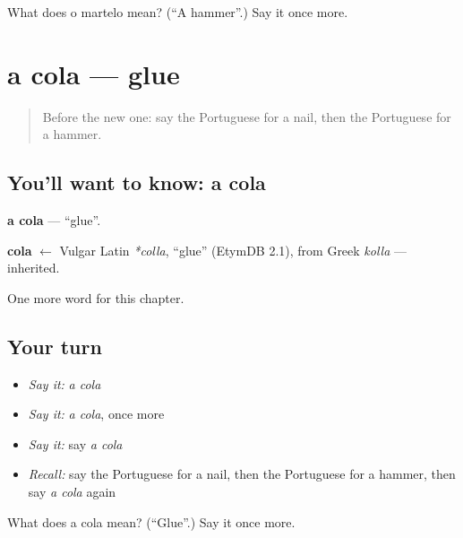 \begin{tcolorbox}[breakable,colback=teal!4,colframe=teal!35!black,title={Before you move on}]
What does o martelo mean? (\textquotedblleft{}A hammer\textquotedblright{}.) Say it once more.
\end{tcolorbox}
\section[a cola]{a cola — glue}

\label{lesson:PT-C98-cola}



\begin{quote}
Before the new one: say the Portuguese for a nail, then the Portuguese for a hammer.
\end{quote}

\subsection*{You'll want to know: a cola}
\textbf{a cola} — \textquotedblleft{}glue\textquotedblright{}.

\begin{cousinweb}
\textbf{cola} $\leftarrow$ Vulgar Latin \emph{*colla}, \textquotedblleft{}glue\textquotedblright{} (EtymDB 2.1), from Greek \emph{kolla} — inherited.
\end{cousinweb}

\begin{grammarlens}[title={What you've built}]
One more word for this chapter.
\end{grammarlens}

\subsection*{Your turn}
\begin{itemize}
\raggedright
  \item \emph{Say it:} \emph{a cola}
  \item \emph{Say it:} \emph{a cola}, once more
  \item \emph{Say it:} say \emph{a cola}
  \item \emph{Recall:} say the Portuguese for a nail, then the Portuguese for a hammer, then say \emph{a cola} again
\end{itemize}

\begin{tcolorbox}[breakable,colback=teal!4,colframe=teal!35!black,title={Before you move on}]
What does a cola mean? (\textquotedblleft{}Glue\textquotedblright{}.) Say it once more.
\end{tcolorbox}
